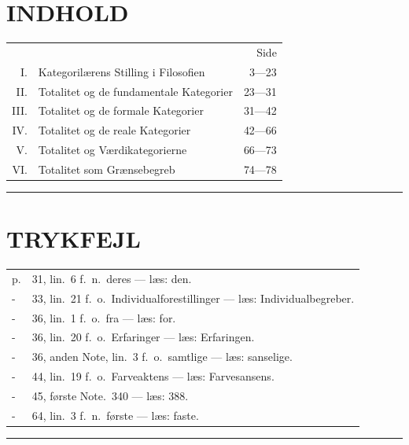 \documentclass[12pt]{article}
\newcommand{\opage}[1]{\marginnote{\footnotesize\textit{[#1]}}}
\begin{document}
\clearpage
\section*{INDHOLD}

\noindent\opage{80}%
\begin{tabular}{@{}r@{\ \ }p{}@{\ }r@{}}
 & & Side\\
I. & Kategorilærens Stilling i Filosofien\dotfill & 3---23\\
II. & Totalitet og de fundamentale Kategorier\dotfill & 23---31\\
III. & Totalitet og de formale Kategorier\dotfill & 31---42\\
IV. & Totalitet og de reale Kategorier\dotfill & 42---66\\
V. & Totalitet og Værdikategorierne\dotfill & 66---73\\
VI. & Totalitet som Grænsebegreb\dotfill & 74---78
\end{tabular}

\begin{center}
\rule{5em}{0.4pt}
\end{center}

\section*{TRYKFEJL}

\begin{center}
\begin{tabular}{@{}l@{\ }l@{}}
p. & 31, lin.\ 6 f.\ n.\ deres --- læs: den.\\
- & 33, lin.\ 21 f.\ o.\ Individualforestillinger --- læs: Individualbegreber.\\
- & 36, lin.\ 1 f.\ o.\ fra --- læs: for.\\
- & 36, lin.\ 20 f.\ o.\ Erfaringer --- læs: Erfaringen.\\
- & 36, anden Note, lin.\ 3 f.\ o.\ samtlige --- læs: sanselige.\\
- & 44, lin.\ 19 f.\ o.\ Farveaktens --- læs: Farvesansens.\\
- & 45, første Note.\ 340 --- læs: 388.\\
- & 64, lin.\ 3 f.\ n.\ første --- læs: faste.
\end{tabular}

\bigskip
\rule{5em}{0.4pt}
\end{center}
\end{document}
